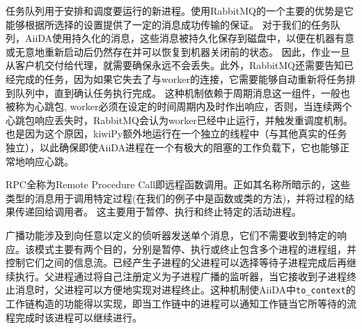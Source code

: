 任务队列用于安排和调度要运行的新进程。使用RabbitMQ的一个主要的优势是它能够根据所选择的设置提供了一定的消息成功传输的保证。
对于我们的任务队列，AiiDA使用持久化的消息，这些消息被持久化保存到磁盘中，以便在机器有意或无意地重新启动后仍然存在并可以恢复到机器关闭前的状态。
因此，作业一旦从客户机交付给代理，就需要确保永远不会丢失。此外，RabbitMQ还需要告知已经完成的任务，因为如果它失去了与worker的连接，它需要能够自动重新将任务排到队列中，直到确认任务执行完成。
这种机制依赖于周期消息这一组件，一般也被称为心跳包, worker必须在设定的时间周期内及时作出响应，否则，当连续两个心跳包响应丢失时，RabbitMQ会认为worker已经中止运行，并触发重调度机制。
也是因为这个原因，kiwiPy额外地运行在一个独立的线程中（与其他真实的任务独立），以此确保即使AiiDA进程在一个有极大的阻塞的工作负载下，它也能够正常地响应心跳。

RPC全称为Remote Procedure Call即远程函数调用。正如其名称所暗示的，这些类型的消息用于调用特定过程(在我们的例子中是函数或类的方法)，并将过程的结果传递回给调用者。
这主要用于暂停、执行和终止特定的活动进程。

广播功能涉及到向任意以定义的侦听器发送单个消息，它们不需要收到特定的响应。该模式主要有两个目的，分别是暂停、执行或终止包含多个进程的进程组，并控制它们之间的信息流。已经产生子进程的父进程可以选择等待子进程完成后再继续执行。父进程通过将自己注册定义为子进程广播的监听器，当它接收到子进程终止消息时，父进程可以方便地实现对进程终止。这种机制使AiiDA中\texttt{to\_context}的工作链构造的功能得以实现，即当工作链中的进程可以通知工作链当它所等待的流程完成时该进程可以继续进行。
